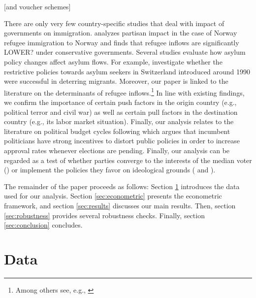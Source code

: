 \documentclass[a4paper,12pt]{article}
\begin{document}
 [and voucher schemes]

There are only very few country-specific studies that deal with impact of governments on immigration. \citet{gudbrandsen2010} analyzes partisan impact in the case of Norway refugee immigration to Norway and finds that refugee inflows are significantly LOWER? under conservative governments. Several studies evaluate how asylum policy changes affect asylum flows. For example, \citet{holzer2000} investigate whether the restrictive policies towards asylum seekers in Switzerland introduced around 1990 were successful in deterring migrants. Moreover, our paper is linked to the literature on the determinants of refugee inflows.\footnote{Among others see, e.g., \citep{neumayer2005, moore2007, hatton2009, hatton2016}} In line with existing findings, we confirm the importance of certain push factors in the origin country (e.g., political terror and civil war) as well as certain pull factors in the destination country (e.g., its labor market situation). Finally, our analysis relates to the literature on political budget cycles following \citet{nor75} which argues that incumbent politicians have strong incentives to distort public policies in order to increase approval rates whenever elections are pending. Finally,
 our analysis can be regarded as a test of whether parties converge to the interests of the median voter (\citet{downs1957}) or implement the policies they favor on ideological grounds (\citet{hibbs1977} and \citet{alesina1987}).


The remainder of the paper proceeds as follows: Section \ref{sec:data} introduces the data used for our analysis. Section \ref{sec:econometric} presents the econometric framework, and section \ref{sec:results} discusses our main results. Then, section \ref{sec:robustness} provides several robustness checks. Finally, section \ref{sec:conclusion} concludes.

\section{Data} \label{sec:data}
\end{document}
